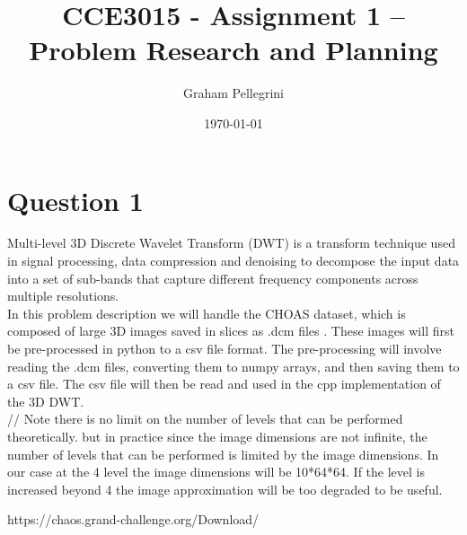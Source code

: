 \documentclass{article}
\title{CCE3015 - Assignment 1 – Problem Research and Planning}
\author{Graham Pellegrini}
\date{\today}
\begin{document}
\maketitle
\section{Question 1}
Multi-level 3D Discrete Wavelet Transform (DWT) is a transform technique used in signal processing, data compression and denoising to decompose the input data into a set of sub-bands that capture different frequency components across multiple resolutions.\\

In this problem description we will handle the CHOAS dataset, which is composed of large 3D images saved in slices as .dcm files \cite{choas}. These images will first be pre-processed in python to a csv file format. The pre-processing will involve reading the .dcm files, converting them to numpy arrays, and then saving them to a csv file. The csv file will then be read and used in the cpp implementation of the 3D DWT.\\


// Note there is no limit on the number of levels that can be performed theoretically. but in practice since the image dimensions are not infinite, the number of levels that can be performed is limited by the image dimensions. In our case at the 4 level the image dimensions will be 10*64*64. If the level is increased beyond 4 the image approximation will be too degraded to be useful.



https://chaos.grand-challenge.org/Download/
\end{document}
